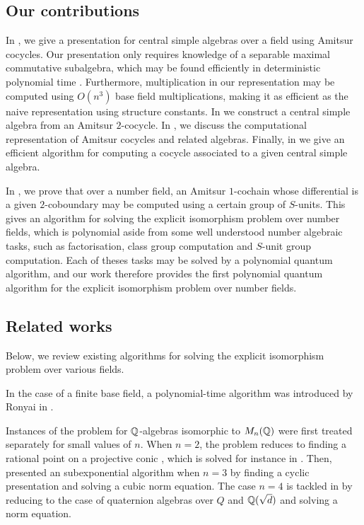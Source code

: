 \subsection{Our contributions}
In , we give a presentation for central simple algebras over a field using Amitsur cocycles. Our presentation only requires knowledge of a separable maximal commutative subalgebra, which may be found efficiently in deterministic polynomial time \cite{graaf2000finding}. Furthermore, multiplication in our representation may be computed using \(O(n^3)\) base field multiplications, making it as efficient as the naive representation using structure constants. In  we construct a central simple algebra from an Amitsur \(2\)-cocycle. In , we discuss the computational representation of Amitsur cocycles and related algebras. Finally, in  we give an efficient algorithm for computing a cocycle associated to a given central simple algebra.

In , we prove that over a number field, an Amitsur \(1\)-cochain whose differential is a given \(2\)-coboundary may be computed using a certain group of \(S\)-units. This gives an algorithm for solving the explicit isomorphism problem over number fields, which is polynomial aside from some well understood number algebraic tasks, such as factorisation, class group computation and \(S\)-unit group computation. Each of theses tasks may be solved by a polynomial quantum algorithm, and our work therefore provides the first polynomial quantum algorithm for the explicit isomorphism problem over number fields.

\subsection{Related works}
Below, we review existing algorithms for solving the explicit isomorphism problem over various fields. 

In the case of a finite base field, a polynomial-time algorithm was introduced by Ronyai in \cite{ronyai1990computing}.

Instances of the problem for \(\mathbb{Q}\)-algebras isomorphic to \(M_n(\mathbb{Q})\) were first treated separately for small values of \(n\). When \(n=2\), the problem reduces to finding a rational point on a projective conic \cite[Theorem 5.5.4]{voight2021quaternion}, which is solved for instance in \cite{cremona2003efficient}. Then, \cite{de2006lie} presented an subexponential algorithm when \(n=3\) by finding a cyclic presentation and solving a cubic norm equation. The case \(n=4\) is tackled in \cite{pilnikova2007trivializing} by reducing to the case of quaternion algebras over \(Q\) and \(\mathbb{Q}(\sqrt{d})\) and solving a norm equation.

